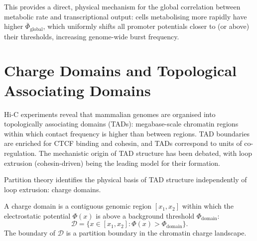 This provides a direct, physical mechanism for the global correlation between
metabolic rate and transcriptional output: cells metabolising more rapidly
have higher $\bar\Phi_{\mathrm{global}}$, which uniformly shifts all promoter
potentials closer to (or above) their thresholds, increasing genome-wide burst
frequency.

\section{Charge Domains and Topological Associating Domains}
\label{sec:tad_charge_domains}

Hi-C experiments reveal that mammalian genomes are organised into topologically
associating domains (TADs): megabase-scale chromatin regions within which
contact frequency is higher than between regions. TAD boundaries are enriched
for CTCF binding and cohesin, and TADs correspond to units of co-regulation.
The mechanistic origin of TAD structure has been debated, with loop extrusion
(cohesin-driven) being the leading model for their formation.

Partition theory identifies the physical basis of TAD structure independently
of loop extrusion: charge domains.

\begin{definition}
\label{def:charge_domain}
A charge domain is a contiguous genomic region $[x_1, x_2]$ within which the
electrostatic potential $\Phi(x)$ is above a background threshold
$\Phi_{\mathrm{domain}}$:
\begin{equation}
  \mathcal{D} = \{x \in [x_1, x_2] : \Phi(x) > \Phi_{\mathrm{domain}}\}.
  \label{eq:charge_domain}
\end{equation}
The boundary of $\mathcal{D}$ is a partition boundary in the chromatin charge
landscape.
\end{definition}

